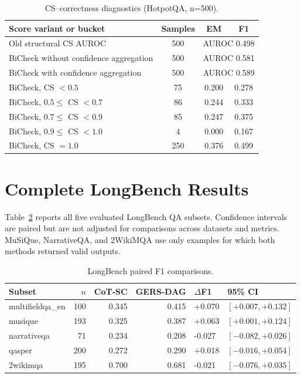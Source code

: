 \documentclass[11pt]{article}
\begin{document}
\begin{table}[h]
\centering
\caption{CS--correctness diagnostics (HotpotQA, n=500).}
\label{tab:buckets}
\small
\begin{tabular}{lccc}
\toprule
Score variant or bucket & Samples & EM & F1 \\
\midrule
Old structural CS AUROC & 500 & \multicolumn{2}{c}{AUROC 0.498} \\
BiCheck without confidence aggregation & 500 & \multicolumn{2}{c}{AUROC 0.581} \\
BiCheck with confidence aggregation & 500 & \multicolumn{2}{c}{AUROC 0.589} \\
\midrule
BiCheck, CS $<0.5$ & 75 & 0.200 & 0.278 \\
BiCheck, $0.5\le$ CS $<0.7$ & 86 & 0.244 & 0.333 \\
BiCheck, $0.7\le$ CS $<0.9$ & 85 & 0.247 & 0.375 \\
BiCheck, $0.9\le$ CS $<1.0$ & 4 & 0.000 & 0.167 \\
BiCheck, CS $=1.0$ & 250 & 0.376 & 0.499 \\
\bottomrule
\end{tabular}
\end{table}

\section{Complete LongBench Results}

Table~\ref{tab:longbench} reports all five evaluated LongBench QA subsets. Confidence intervals are paired but are not adjusted for comparisons across datasets and metrics. MuSiQue, NarrativeQA, and 2WikiMQA use only examples for which both methods returned valid outputs.

\begin{table}[h]
\centering
\caption{LongBench paired F1 comparisons.}
\label{tab:longbench}
\small
\begin{tabular}{lrrrll}
\toprule
Subset & $n$ & CoT-SC & GERS-DAG & $\Delta$F1 & 95\% CI \\
\midrule
multifieldqa\_en & 100 & 0.345 & 0.415 & +0.070 & $[+0.007,+0.132]$ \\
musique & 193 & 0.325 & 0.387 & +0.063 & $[+0.001,+0.124]$ \\
narrativeqa & 71 & 0.234 & 0.208 & -0.027 & $[-0.082,+0.026]$ \\
qasper & 200 & 0.272 & 0.290 & +0.018 & $[-0.016,+0.054]$ \\
2wikimqa & 195 & 0.700 & 0.681 & -0.021 & $[-0.076,+0.035]$ \\
\bottomrule
\end{tabular}
\end{table}
\end{document}
